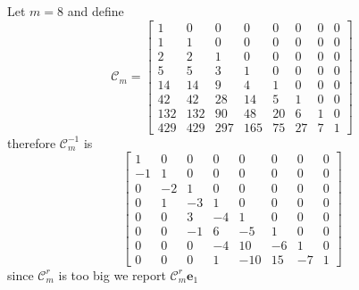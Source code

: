 Let $m=8$ and define
\begin{displaymath}
\mathcal{C}_{m}=\left[\begin{matrix}1 & 0 & 0 & 0 & 0 & 0 & 0 & 0\\1 & 1 & 0 & 0 & 0 & 0 & 0 & 0\\2 & 2 & 1 & 0 & 0 & 0 & 0 & 0\\5 & 5 & 3 & 1 & 0 & 0 & 0 & 0\\14 & 14 & 9 & 4 & 1 & 0 & 0 & 0\\42 & 42 & 28 & 14 & 5 & 1 & 0 & 0\\132 & 132 & 90 & 48 & 20 & 6 & 1 & 0\\429 & 429 & 297 & 165 & 75 & 27 & 7 & 1\end{matrix}\right]
\end{displaymath}
therefore $\mathcal{C}_{m}^{-1}$ is
\begin{displaymath}
\left[\begin{matrix}1 & 0 & 0 & 0 & 0 & 0 & 0 & 0\\-1 & 1 & 0 & 0 & 0 & 0 & 0 & 0\\0 & -2 & 1 & 0 & 0 & 0 & 0 & 0\\0 & 1 & -3 & 1 & 0 & 0 & 0 & 0\\0 & 0 & 3 & -4 & 1 & 0 & 0 & 0\\0 & 0 & -1 & 6 & -5 & 1 & 0 & 0\\0 & 0 & 0 & -4 & 10 & -6 & 1 & 0\\0 & 0 & 0 & 1 & -10 & 15 & -7 & 1\end{matrix}\right]
\end{displaymath}
since $\mathcal{C}_{m}^{r}$ is too big we report $\mathcal{C}_{m}^{r}\textbf{e}_{1}$ 
